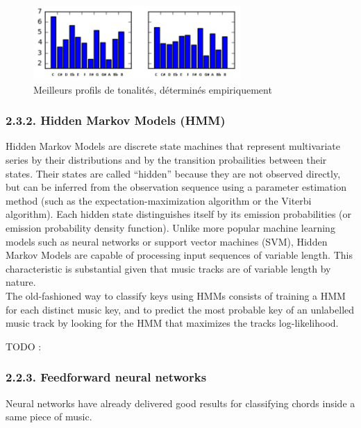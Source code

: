 \documentclass[letterpaper]{article}
\begin{document}
\begin{figure}[h!]
\begin{center}
\includegraphics[width=3.1in,angle=0]{imgs/Custom.png}
\caption{Meilleurs profils de tonalités, déterminés empiriquement}
\label{fig1}
\end{center}
\end{figure}

\FloatBarrier

\subsubsection*{2.3.2. Hidden Markov Models (HMM)}

Hidden Markov Models are discrete state machines that represent multivariate series by their distributions and by
the transition probailities between their states. Their states are called “hidden” because they are not observed directly,
but can be inferred from the observation sequence using a parameter estimation method (such as the expectation-maximization algorithm
or the Viterbi algorithm). Each hidden state distinguishes itself by its emission probabilities (or emission probability density function).
Unlike more popular machine learning models such as neural networks or support vector machines (SVM), Hidden Markov Models are capable of
processing input sequences of variable length. This characteristic is substantial given that music tracks are of variable length by nature.\\

The old-fashioned way to classify keys using HMMs consists of training a HMM for each distinct music key, and to predict the most probable 
key of an unlabelled music track by looking for the HMM that maximizes the track\textquotesingle s log-likelihood.

TODO : \citep{JP} \citep{DR}

\subsubsection{2.2.3. Feedforward neural networks}

Neural networks have already delivered good results for classifying chords inside a same piece of music.
\end{document}
